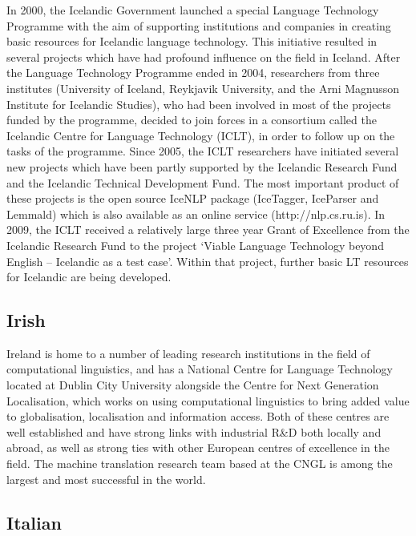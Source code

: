 \documentclass[10pt, plain]{../../metanetpaper}
\begin{document}
\begin{multicols}{2}
In 2000, the Icelandic Government launched a special Language Technology Programme with the aim of supporting institutions and companies in creating basic resources for Icelandic language technology. This initiative resulted in several projects which have had profound influence on the field in Iceland. After the Language Technology Programme ended in 2004, researchers from three institutes (University of Iceland, Reykjavik University, and the Arni Magnusson Institute for Icelandic Studies), who had been involved in most of the projects funded by the programme, decided to join forces in a consortium called the Icelandic Centre for Language Technology (ICLT), in order to follow up on the tasks of the programme. Since 2005, the ICLT researchers have initiated several new projects which have been partly supported by the Icelandic Research Fund and the Icelandic Technical Development Fund. The most important product of these projects is the open source IceNLP package (IceTagger, IceParser and Lemmald) which is also available as an online service (http://nlp.cs.ru.is). In 2009, the ICLT received a relatively large three year Grant of Excellence from the Icelandic Research Fund to the project ‘Viable Language Technology beyond English – Icelandic as a test case’. Within that project, further basic LT resources for Icelandic are being developed.

\subsection*{Irish}
\label{sec:irish}

Ireland is home to a number of leading research institutions in the field of computational linguistics, and has a National Centre for Language Technology located at Dublin City University alongside the Centre for Next Generation Localisation, which works on using computational linguistics to bring added value to globalisation, localisation and information access. Both of these centres are well established and have strong links with industrial R\&D both locally and abroad, as well as strong ties with other European centres of excellence in the field. The machine translation research team based at the CNGL is among the largest and most successful in the world. 


\subsection*{Italian}
\label{sec:italian}


\end{multicols}
\end{document}
